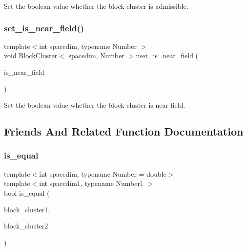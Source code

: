 Set the boolean value whether the block cluster is admissible. \mbox{\label{classBlockCluster_a89063f39db2c5868abb54650108623dc}} 
\subsubsection{\texorpdfstring{set\+\_\+is\+\_\+near\+\_\+field()}{set\_is\_near\_field()}}
{\footnotesize\ttfamily template$<$int spacedim, typename Number $>$ \\
void \hyperlink{classBlockCluster}{Block\+Cluster}$<$ spacedim, Number $>$\+::set\+\_\+is\+\_\+near\+\_\+field (\begin{DoxyParamCaption}\item[{const bool}]{is\+\_\+near\+\_\+field }\end{DoxyParamCaption})}

Set the boolean value whether the block cluster is near field. 

\subsection{Friends And Related Function Documentation}
\mbox{\label{classBlockCluster_a770daa1c7399aa72cfb7e1e7dc65b6bb}} 
\subsubsection{\texorpdfstring{is\+\_\+equal}{is\_equal}}
{\footnotesize\ttfamily template$<$int spacedim, typename Number = double$>$ \\
template$<$int spacedim1, typename Number1 $>$ \\
bool is\+\_\+equal (\begin{DoxyParamCaption}\item[{const \hyperlink{classBlockCluster}{Block\+Cluster}$<$ spacedim, Number $>$ \&}]{block\+\_\+cluster1,  }\item[{const \hyperlink{classBlockCluster}{Block\+Cluster}$<$ spacedim, Number $>$ \&}]{block\+\_\+cluster2 }\end{DoxyParamCaption})\hspace{0.3cm}{\ttfamily [friend]}}

